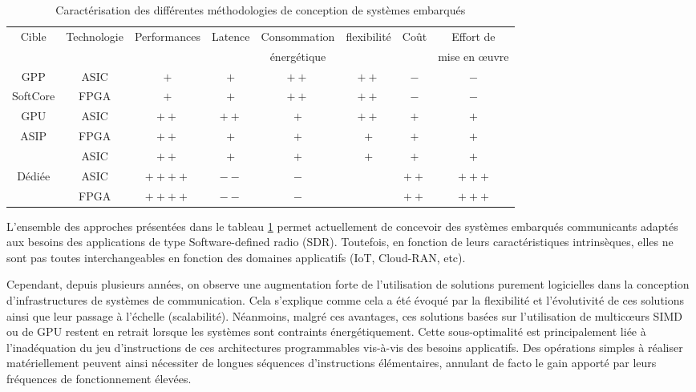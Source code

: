 \documentclass[../main.tex]{subfiles}
\begin{document}
\begin{table}
    \footnotesize
    \centering
    \begin{tabular}{c|ccccccc}
        \toprule
        \multirow{2}{*}{Cible} & \multirow{2}{*}{Technologie} & \multirow{2}{*}{Performances} & \multirow{2}{*}{Latence} & Consommation & \multirow{2}{*}{flexibilité} & \multirow{2}{*}{Coût} & Effort de \\
              &             &              &         & énergétique  &             &      & mise en œuvre \\
        \bottomrule
        GPP                     & ASIC  & $+$  & $+$  & $++$ & $++$ & $-$  & $-$ \\
        SoftCore                & FPGA  & $+$  & $+$  & $++$ & $++$ & $-$  & $-$ \\
        GPU                     & ASIC  & $++$  & $++$ & $+$  & $++$ & $+$  & $+$ \\
        \bottomrule
        \multirow{2}{*}{ASIP}   & FPGA & $++$   & $+$  & $+$  & $+$  & $+$  & $+$ \\
                                & ASIC & $++$   & $+$  & $+$  & $+$  & $+$  & $+$ \\
        \bottomrule
        \multirow{2}{*}{Dédiée} & ASIC & $++++$ & $--$ & $-$  &      & $++$ & $+++$ \\
                                & FPGA & $++++$ & $--$ & $-$  &      & $++$ & $+++$ \\
        
        \bottomrule
    \end{tabular}
    \caption{Caractérisation des différentes méthodologies de conception de systèmes embarqués}
    \label{tab:archis}
\end{table}

L’ensemble des approches présentées dans le tableau \ref{tab:archis} permet actuellement de concevoir des systèmes embarqués communicants adaptés aux besoins des applications de type Software-defined radio (SDR). Toutefois, en fonction de leurs caractéristiques intrinsèques, elles ne sont pas toutes interchangeables en fonction des domaines applicatifs (IoT, Cloud-RAN, etc).

Cependant, depuis plusieurs années, on observe une augmentation forte de l'utilisation de solutions purement logicielles dans la conception d'infrastructures de systèmes de communication. Cela s'explique comme cela a été évoqué par la flexibilité et l'évolutivité de ces solutions ainsi que leur passage à l'échelle (scalabilité). Néanmoins, malgré ces avantages, ces solutions basées sur l'utilisation de multicœurs SIMD ou de GPU restent en retrait lorsque les systèmes sont contraints énergétiquement. Cette sous-optimalité est principalement liée à l'inadéquation du jeu d'instructions de ces architectures programmables vis-à-vis des besoins applicatifs. Des opérations simples à réaliser matériellement peuvent ainsi nécessiter de longues séquences d'instructions élémentaires, annulant de facto le gain apporté par leurs fréquences de fonctionnement élevées.  
\end{document}
